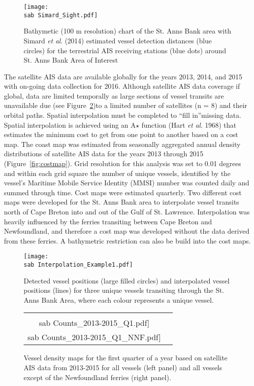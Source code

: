 \documentclass[letterpaper,portrait,11pt]{scrartcl}
\numberwithin{equation}{section}		%
\numberwithin{figure}{section}		%
\numberwithin{table}{section}				%
\newcommand{\ecomod}{\string~/ecomod_data/}   %
\newcommand{\sab}{\ecomod/mpa/sab/}   %
\begin{document}
\begin{figure}[h]
	\label{fig:DetAIS}
	\centering
	\texttt{[image: \\sab Simard\_Sight.pdf]}
	\caption{Bathymetic (100 m resolution) chart of the  St. Anns Bank area with Simard \textit{et al}. (2014) estimated vessel detection distances (blue circles) for the terrestrial AIS receiving stations (blue dots) around St. Anns Bank Area of Interest}
\end{figure}


The satellite AIS data are available globally for the years 2013, 2014, and 2015 with on-going data collection for 2016. Although satellite AIS data coverage if global, data are limited temporally as large sections of vessel transits are unavailable due (see Figure~\ref{fig:astar})to a limited number of satellites (n = 8) and their orbital paths.  Spatial interpolation must be completed to \textquotedblleft fill in\textquotedblright  missing data.  Spatial interpolation is achieved using an A$\star$ function (Hart \textit{et al}. 1968)  that estimates the minimum cost to get from one point to another based on a cost map.  The coast map was estimated from seasonally aggregated annual density distributions of satellite AIS data for the years 2013 through 2015 (Figure~\ref{fig:costmap}).  Grid resolution for this analysis was set to 0.01 degrees and within each grid square the number of unique vessels, identified by the vessel's Maritime Mobile Service Identity (MMSI) number was counted daily and summed through time.  Cost maps were estimated quarterly.  Two different cost maps were developed for the St. Anns Bank area to interpolate vessel transits north of Cape Breton into and out of the Gulf of St. Lawrence.  Interpolation was heavily influenced by the ferries transiting between Cape Breton and Newfoundland, and therefore a cost map was developed without the data derived from these ferries.  A bathymetric restriction can also be build into the cost maps.

\begin{figure}[h]
	\label{fig:astar}
	\centering
	\texttt{[image: \\sab Interpolation\_Example1.pdf]}
	\caption{Detected vessel positions (large filled circles) and interpolated vessel positions (lines) for three unique vessels transiting through the St. Anns Bank Area, where each colour represents a unique vessel.}
\end{figure}


\begin{figure}[h]
	\label{fig:countmaps}
	\centering
	\begin{tabular}{cc}
		\texttt{[image: \\sab Counts\_2013-2015\_Q1.pdf]} &
		\texttt{[image: \\sab Counts\_2013-2015\_Q1\_NNF.pdf]}
	\end{tabular}
	\caption{Vessel density maps for the first quarter of a year based on satellite AIS data from 2013-2015 for all vessels (left panel) and all vessels except of the Newfoundland ferries (right panel).}
\end{figure}
\end{document}
